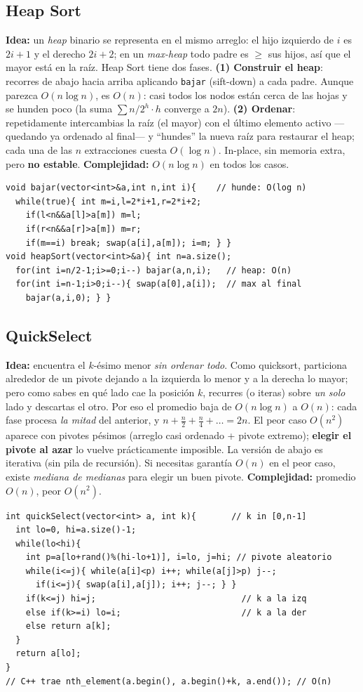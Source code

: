 \documentclass[10pt,a4paper,twocolumn]{article}
\begin{document}
\subsection{Heap Sort}
\textbf{Idea:} un \emph{heap} binario se representa en el mismo arreglo:
el hijo izquierdo de $i$ es $2i+1$ y el derecho $2i+2$; en un
\emph{max-heap} todo padre es $\geq$ sus hijos, así que el mayor está en
la raíz. Heap Sort tiene dos fases. \textbf{(1) Construir el heap}:
recorres de abajo hacia arriba aplicando \texttt{bajar} (sift-down) a
cada padre. Aunque parezca $O(n\log n)$, es $O(n)$: casi todos los nodos
están cerca de las hojas y se hunden poco (la suma
$\sum n/2^h\cdot h$ converge a $2n$). \textbf{(2) Ordenar}: repetidamente
intercambias la raíz (el mayor) con el último elemento activo —quedando
ya ordenado al final— y ``hundes'' la nueva raíz para restaurar el heap;
cada una de las $n$ extracciones cuesta $O(\log n)$. In-place, sin
memoria extra, pero \textbf{no estable}. \textbf{Complejidad:}
$O(n\log n)$ en todos los casos.
\begin{lstlisting}[style=cpp]
void bajar(vector<int>&a,int n,int i){    // hunde: O(log n)
  while(true){ int m=i,l=2*i+1,r=2*i+2;
    if(l<n&&a[l]>a[m]) m=l;
    if(r<n&&a[r]>a[m]) m=r;
    if(m==i) break; swap(a[i],a[m]); i=m; } }
void heapSort(vector<int>&a){ int n=a.size();
  for(int i=n/2-1;i>=0;i--) bajar(a,n,i);   // heap: O(n)
  for(int i=n-1;i>0;i--){ swap(a[0],a[i]);  // max al final
    bajar(a,i,0); } }
\end{lstlisting}


\subsection{QuickSelect}
\textbf{Idea:} encuentra el $k$-ésimo menor \emph{sin ordenar todo}.
Como quicksort, particiona alrededor de un pivote dejando a la izquierda
lo menor y a la derecha lo mayor; pero como sabes en qué lado cae la
posición $k$, recurres (o iteras) sobre \emph{un solo} lado y descartas
el otro. Por eso el promedio baja de $O(n\log n)$ a $O(n)$: cada fase
procesa \emph{la mitad} del anterior, y $n+\tfrac{n}{2}+\tfrac{n}{4}+
\dots = 2n$. El peor caso $O(n^2)$ aparece con pivotes pésimos (arreglo
casi ordenado + pivote extremo); \textbf{elegir el pivote al azar} lo
vuelve prácticamente imposible. La versión de abajo es iterativa (sin
pila de recursión). Si necesitas garantía $O(n)$ en el peor caso, existe
\emph{mediana de medianas} para elegir un buen pivote.
\textbf{Complejidad:} promedio $O(n)$, peor $O(n^2)$.
\begin{lstlisting}[style=cpp]
int quickSelect(vector<int> a, int k){       // k in [0,n-1]
  int lo=0, hi=a.size()-1;
  while(lo<hi){
    int p=a[lo+rand()%(hi-lo+1)], i=lo, j=hi; // pivote aleatorio
    while(i<=j){ while(a[i]<p) i++; while(a[j]>p) j--;
      if(i<=j){ swap(a[i],a[j]); i++; j--; } }
    if(k<=j) hi=j;                             // k a la izq
    else if(k>=i) lo=i;                        // k a la der
    else return a[k];
  }
  return a[lo];
}
// C++ trae nth_element(a.begin(), a.begin()+k, a.end()); // O(n)
\end{lstlisting}
\end{document}
